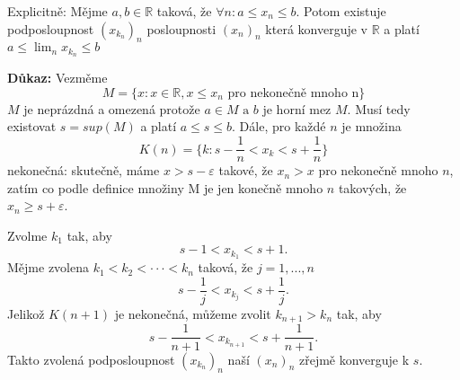 \documentclass[../main.tex]{subfiles}
\begin{document}
\noindent
\hspace{1.2mm}
Explicitně:
Mějme $a,b \in \mathbb{R}$ taková, že $\forall n: a \leq x_n \leq b$. Potom existuje podposloupnost
$(x_{k_n})_n$ posloupnosti $(x_n)_n$ která konverguje v $\mathbb{R}$ a platí
$a \leq \lim_n x_{k_n} \leq b$

\vspace{5mm}
\noindent
\textbf{Důkaz:} 
Vezměme \[M = \{x : x \in \mathbb{R}, x \leq x_n \text{ pro nekonečně mnoho n}\}\]
$M$ je neprázdná a omezená protože $a \in M \text{ a } b$ je horní mez $M$. Musí tedy existovat $s = sup(M)$ a platí 
$a \leq s \leq b$. Dále, pro každé $n$ je množina 
\[K(n) = \{k : s - \frac{1}{n} < x_k < s + \frac{1}{n}\}\]
nekonečná: skutečně, máme $x > s - \varepsilon$ takové, že $x_n > x$ pro nekonečně mnoho $n$, zatím co podle definice množiny M je jen
konečně mnoho $n$ takových, že $x_n \geq s + \varepsilon$. 

Zvolme $k_1$ tak, aby
\[s - 1 < x_{k_{1}} < s+1.\]
Mějme zvolena $k_1 < k_2 < \cdot \cdot \cdot < k_n$ taková, že $j = 1,...,n$
\[s - \frac{1}{j} < x_{k_j} < s + \frac{1}{j}.\]
Jelikož $K(n+1)$ je nekonečná, můžeme zvolit $k_{n+1} > k_n$ tak, aby
\[s - \frac{1}{n+1} < x_{k_{n+1}} < s + \frac{1}{n+1}.\]
Takto zvolená podposloupnost $(x_{k_n})_n$ naší $(x_n)_n$ zřejmě konverguje k $s$.
\end{document}
